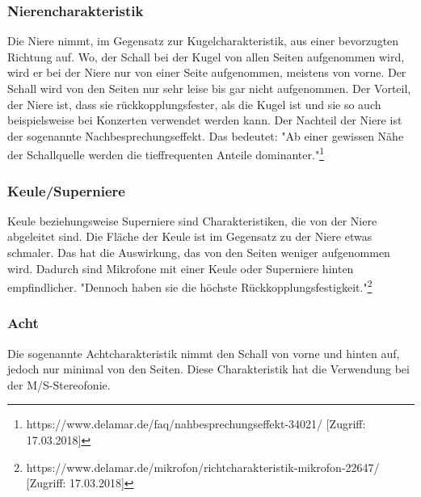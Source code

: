 \subsubsection{Nierencharakteristik}
Die Niere nimmt, im Gegensatz zur Kugelcharakteristik, aus einer bevorzugten Richtung auf. Wo, der Schall bei der Kugel von allen Seiten aufgenommen wird, wird er bei der Niere nur von einer Seite aufgenommen, meistens von vorne. Der Schall wird von den Seiten nur sehr leise bis gar nicht aufgenommen. Der Vorteil, der Niere ist, dass sie rückkopplungsfester, als die Kugel ist und sie so auch beispielsweise bei Konzerten verwendet werden kann. Der Nachteil der Niere ist der sogenannte Nachbesprechungseffekt. Das bedeutet: "Ab einer gewissen Nähe der Schallquelle werden die tieffrequenten Anteile dominanter."\footnote{\label{}https://www.delamar.de/faq/nahbesprechungseffekt-34021/ [Zugriff: 17.03.2018]}
\subsubsection{Keule/Superniere}
Keule beziehungsweise Superniere sind Charakteristiken, die von der Niere abgeleitet sind. Die Fläche der Keule ist im Gegensatz zu der Niere etwas schmaler. Das hat die Auswirkung, das von den Seiten weniger aufgenommen wird. Dadurch sind Mikrofone mit einer Keule oder Superniere hinten empfindlicher. "Dennoch haben sie die höchste Rückkopplungsfestigkeit."\footnote{\label{}https://www.delamar.de/mikrofon/richtcharakteristik-mikrofon-22647/ [Zugriff: 17.03.2018]}
\subsubsection{Acht}
Die sogenannte Achtcharakteristik nimmt den Schall von vorne und hinten auf, jedoch nur minimal von den Seiten. Diese Charakteristik hat die Verwendung bei der M/S-Stereofonie. 
